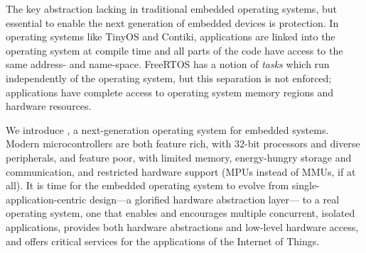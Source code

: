 The key abstraction lacking in traditional embedded operating systems, but
essential to enable the next generation of embedded devices is protection. In
operating systems like TinyOS and Contiki, applications are linked into the
operating system at compile time and all parts of the code have access to the
same address- and name-space. FreeRTOS has a notion of \emph{tasks} which run
independently of the operating system, but this separation is not enforced;
applications have complete access to operating system memory regions and
hardware resources.

We introduce \name, a next-generation operating system for embedded systems.
Modern microcontrollers are both feature rich, with 32-bit processors and
diverse peripherals, and feature poor, with limited memory, energy-hungry
storage and communication, and restricted hardware support (MPUs instead of
MMUs, if at all).
%
It is time for the embedded operating system to evolve from single-application-centric
design---a glorified hardware abstraction layer---%
to a real operating system, %
one that enables and encourages multiple concurrent, isolated applications,
provides both hardware abstractions and low-level hardware access, and offers
critical services for the applications of the Internet of Things.


%


